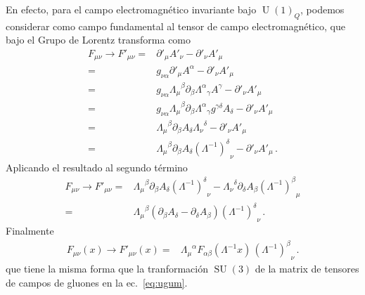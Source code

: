 En efecto, para el campo electromagnético invariante bajo $\operatorname{U}(1)_Q$, podemos considerar como campo fundamental al tensor de campo electromagnético, que bajo el Grupo de Lorentz transforma como
\begin{align}
  F_{\mu\nu} \to F'_{\mu\nu}=&\partial'_{\mu} A'_{\nu} -\partial'_{\nu} A'_{\mu} \nonumber\\
=&g_{\nu\alpha}\partial'_{\mu} A^{\alpha} -\partial'_{\nu} {A'}_{\mu} \nonumber\\
=&g_{\nu\alpha} { \Lambda_{\mu}}^{\beta}\partial_{\beta} {\Lambda^{\alpha}}_{\gamma} {A}^{\gamma} -\partial'_{\nu} {A'}_{\mu} \nonumber\\
=&g_{\nu\alpha} { \Lambda_{\mu}}^{\beta}\partial_{\beta} {\Lambda^{\alpha}}_{\gamma} g^{\gamma\delta} A_{\delta} -\partial'_{\nu} A'_{\mu} \nonumber\\
  =& { \Lambda_{\mu}}^{\beta}\partial_{\beta}   A_{\delta}{\Lambda_{\nu}}^{\delta} -\partial'_{\nu} A'_{\mu} \nonumber\\
  =& { \Lambda_{\mu}}^{\beta}\partial_{\beta}   A_{\delta}{\left( \Lambda^{-1} \right)^{\delta}}_{\nu} -\partial'_{\nu} A'_{\mu} \,.
\end{align}
Aplicando el resultado al segundo término
\begin{align}
  F_{\mu\nu} \to F'_{\mu\nu} =& { \Lambda_{\mu}}^{\beta}\partial_{\beta}   A_{\delta}{\left( \Lambda^{-1} \right)^{\delta}}_{\nu} 
     - { \Lambda_{\nu}}^{\delta}\partial_{\delta} A_{\beta}{\left( \Lambda^{-1} \right)^{\beta}}_{\mu}  \nonumber\\
  =& { \Lambda_{\mu}}^{\beta} \left( \partial_{\beta}   A_{\delta}-      \partial_{\delta} A_{\beta} \right)
{\left( \Lambda^{-1} \right)^{\delta}}_{\nu} \,.
\end{align}
Finalmente
\begin{align}
  F_{\mu\nu}(x) \to F'_{\mu\nu}(x)  =& { \Lambda_{\mu}}^{\alpha}F_{\alpha\beta}\left( \Lambda^{-1}x \right)\,
                   {\left( \Lambda^{-1} \right)^{\beta}}_{\nu} \,.
\end{align}
que tiene la misma forma que la tranformación $\operatorname{SU}(3)$ de la matrix de tensores de campos de gluones en la ec.~\eqref{eq:ugum}.

